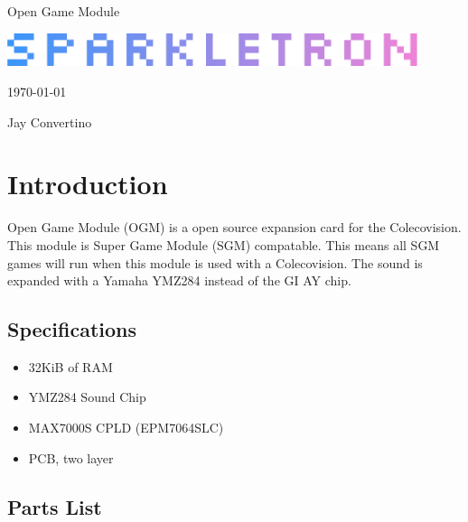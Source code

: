 \begin{titlepage}
  \begin{center}

  {\Huge Open Game Module}

  \vspace{25mm}

  \includegraphics[width=0.90\textwidth,height=\textheight,keepaspectratio]{img/SPARKLETRON.png}

  \vspace{25mm}

  \today

  \vspace{15mm}

  {\Large Jay Convertino}

  \end{center}
\end{titlepage}

\tableofcontents

\newpage

\section{Introduction}

\par
Open Game Module (OGM) is a open source expansion card for the Colecovision. This module is Super Game Module (SGM) compatable.
This means all SGM games will run when this module is used with a Colecovision. The sound is expanded with a Yamaha YMZ284
instead of the GI AY chip.

\subsection{Specifications}

\par
\begin{itemize}
  \item 32KiB of RAM
  \item YMZ284 Sound Chip
  \item MAX7000S CPLD (EPM7064SLC)
  \item PCB, two layer
\end{itemize}

\subsection{Parts List}

